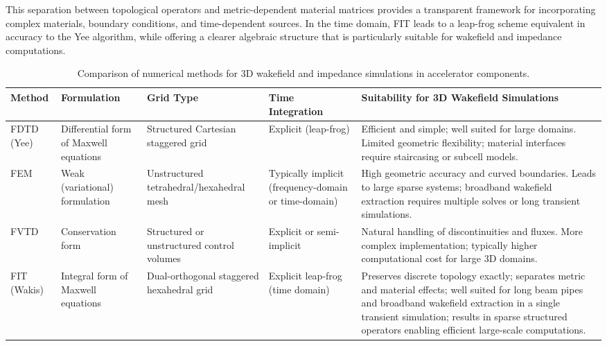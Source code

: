 This separation between topological operators and metric-dependent material matrices provides a transparent framework for incorporating complex materials, boundary conditions, and time-dependent sources. In the time domain, FIT leads to a leap-frog scheme equivalent in accuracy to the Yee algorithm, while offering a clearer algebraic structure that is particularly suitable for wakefield and impedance computations.

\begin{table}[htbp]
\centering
\caption{Comparison of numerical methods for 3D wakefield and impedance simulations in accelerator components.}
\label{tab:numerical_methods_comparison}
\renewcommand{\arraystretch}{1.3}
\begin{tabular}{p{2.5cm} p{2.2cm} p{2.2cm} p{2.2cm} p{3.5cm}}
\hline
\textbf{Method} 
& \textbf{Formulation} 
& \textbf{Grid Type} 
& \textbf{Time Integration} 
& \textbf{Suitability for 3D Wakefield Simulations} \\
\hline

FDTD (Yee) 
& Differential form of Maxwell equations 
& Structured Cartesian staggered grid 
& Explicit (leap-frog) 
& Efficient and simple; well suited for large domains. 
Limited geometric flexibility; material interfaces require staircasing or subcell models. \\

FEM 
& Weak (variational) formulation 
& Unstructured tetrahedral/hexahedral mesh 
& Typically implicit (frequency-domain or time-domain) 
& High geometric accuracy and curved boundaries. 
Leads to large sparse systems; broadband wakefield extraction requires multiple solves or long transient simulations. \\

FVTD 
& Conservation form 
& Structured or unstructured control volumes 
& Explicit or semi-implicit 
& Natural handling of discontinuities and fluxes. 
More complex implementation; typically higher computational cost for large 3D domains. \\

FIT (Wakis) 
& Integral form of Maxwell equations 
& Dual-orthogonal staggered hexahedral grid 
& Explicit leap-frog (time domain) 
& Preserves discrete topology exactly; 
separates metric and material effects; 
well suited for long beam pipes and broadband wakefield extraction in a single transient simulation; 
results in sparse structured operators enabling efficient large-scale computations. \\

\hline
\end{tabular}
\end{table}

